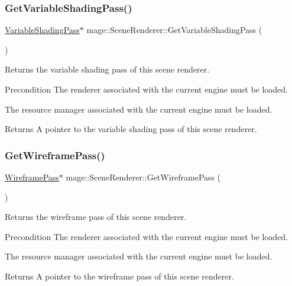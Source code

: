 \subsubsection{\texorpdfstring{Get\+Variable\+Shading\+Pass()}{GetVariableShadingPass()}}
{\footnotesize\ttfamily \hyperlink{classmage_1_1_variable_shading_pass}{Variable\+Shading\+Pass}$\ast$ mage\+::\+Scene\+Renderer\+::\+Get\+Variable\+Shading\+Pass (\begin{DoxyParamCaption}{ }\end{DoxyParamCaption})}

Returns the variable shading pass of this scene renderer.

\begin{DoxyPrecond}{Precondition}
The renderer associated with the current engine must be loaded. 

The resource manager associated with the current engine must be loaded. 
\end{DoxyPrecond}
\begin{DoxyReturn}{Returns}
A pointer to the variable shading pass of this scene renderer. 
\end{DoxyReturn}
\hypertarget{classmage_1_1_scene_renderer_acaeae241945b630dab465533195faac9}{}\label{classmage_1_1_scene_renderer_acaeae241945b630dab465533195faac9} 
\subsubsection{\texorpdfstring{Get\+Wireframe\+Pass()}{GetWireframePass()}}
{\footnotesize\ttfamily \hyperlink{classmage_1_1_wireframe_pass}{Wireframe\+Pass}$\ast$ mage\+::\+Scene\+Renderer\+::\+Get\+Wireframe\+Pass (\begin{DoxyParamCaption}{ }\end{DoxyParamCaption})}

Returns the wireframe pass of this scene renderer.

\begin{DoxyPrecond}{Precondition}
The renderer associated with the current engine must be loaded. 

The resource manager associated with the current engine must be loaded. 
\end{DoxyPrecond}
\begin{DoxyReturn}{Returns}
A pointer to the wireframe pass of this scene renderer. 
\end{DoxyReturn}
\hypertarget{classmage_1_1_scene_renderer_a5b63908f5bdfe6128b43847db01db983}{}\label{classmage_1_1_scene_renderer_a5b63908f5bdfe6128b43847db01db983} 
